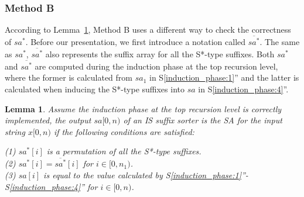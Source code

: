 \documentclass[10pt,journal,compsoc]{IEEEtran}
\newtheorem{lemma}[theorem]{Lemma}
\begin{document}
\begin{algorithm*}

	\caption{The Algorithm Based on Lemma~\ref{lemma:3}.}
	
	\label{alg:2}
	
	\end{algorithm*}


\subsubsection{Method B}\label{sec:proposals:method_b}

According to Lemma~\ref{lemma:4}, Method B uses a different way to check the correctness of $sa^*$. Before our presentation, we first introduce a notation called $\overline{sa^*}$. The same as $sa^*$, $\overline{sa^*}$ also represents the suffix array for all the S*-type suffixes. Both $sa^*$ and $\overline{sa^*}$ are computed during the induction phase at the top recursion level, where the former is calculated from $sa_1$ in S\ref{induction_phase:1}'' and the latter is calculated when inducing the S*-type suffixes into $sa$ in S\ref{induction_phase:4}''. 

\begin{lemma} \label{lemma:4}
    Assume the induction phase at the top recursion level is correctly implemented, the output $sa[0, n)$ of an IS suffix sorter is the SA for the input string $x[0, n)$ if the following conditions are satisfied:

	(1) $sa^*[i]$ is a permutation of all the S*-type suffixes. \\
	(2) $sa^*[i] = \overline{sa^*}[i]$ for $i \in [0, n_1)$. \\
	(3) $sa[i]$ is equal to the value calculated by S\ref{induction_phase:1}''-S\ref{induction_phase:4}'' for $i \in [0, n)$. \\

\end{lemma}
\end{document}
